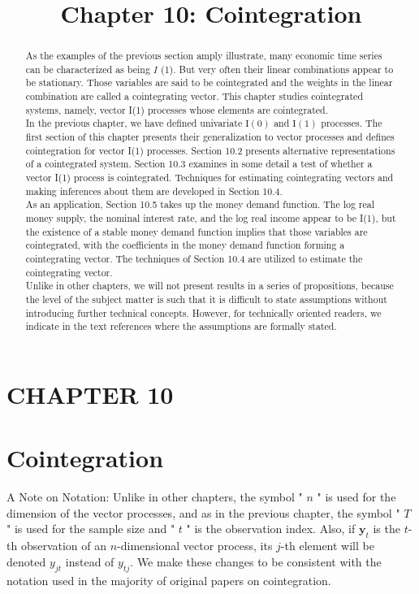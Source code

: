 \documentclass[10pt]{article}
\title{Chapter 10: Cointegration}
\author{}
\date{}
\begin{document}
\maketitle

\section*{CHAPTER 10}
\section*{Cointegration}
\begin{abstract}
As the examples of the previous section amply illustrate, many economic time series can be characterized as being $I$ (1). But very often their linear combinations appear to be stationary. Those variables are said to be cointegrated and the weights in the linear combination are called a cointegrating vector. This chapter studies cointegrated systems, namely, vector I(1) processes whose elements are cointegrated.\\
In the previous chapter, we have defined univariate $\mathrm{I}(0)$ and $\mathrm{I}(1)$ processes. The first section of this chapter presents their generalization to vector processes and defines cointegration for vector I(1) processes. Section 10.2 presents alternative representations of a cointegrated system. Section 10.3 examines in some detail a test of whether a vector I(1) process is cointegrated. Techniques for estimating cointegrating vectors and making inferences about them are developed in Section 10.4.\\
As an application, Section 10.5 takes up the money demand function. The log real money supply, the nominal interest rate, and the log real income appear to be I(1), but the existence of a stable money demand function implies that those variables are cointegrated, with the coefficients in the money demand function forming a cointegrating vector. The techniques of Section 10.4 are utilized to estimate the cointegrating vector.\\
Unlike in other chapters, we will not present results in a series of propositions, because the level of the subject matter is such that it is difficult to state assumptions without introducing further technical concepts. However, for technically oriented readers, we indicate in the text references where the assumptions are formally stated.
\end{abstract}

A Note on Notation: Unlike in other chapters, the symbol " $n$ " is used for the dimension of the vector processes, and as in the previous chapter, the symbol " $T$ " is used for the sample size and " $t$ " is the observation index. Also, if $\mathbf{y}_{t}$ is the $t$-th observation of an $n$-dimensional vector process, its $j$-th element will be denoted $y_{j t}$ instead of $y_{t j}$. We make these changes to be consistent with the notation used in the majority of original papers on cointegration.
\end{document}
